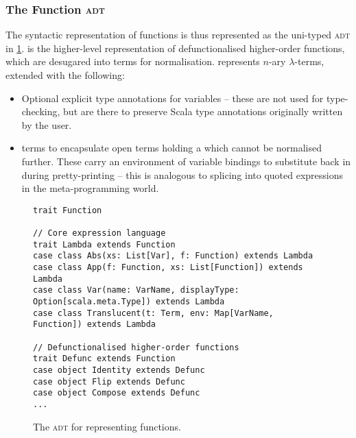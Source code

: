 \documentclass[../../main.tex]{subfiles}
\begin{document}
\subsubsection{The Function \textsc{adt}}
The syntactic representation of functions is thus represented as the uni-typed  \textsc{adt} in \cref{fig:function-adt}.
 is the higher-level representation of defunctionalised higher-order functions, which are desugared into  terms for normalisation.
 represents $n$-ary $\lambda$-terms, extended with the following:
\begin{itemize}
  \item Optional explicit type annotations for variables -- these are not used for type-checking, but are there to preserve Scala type annotations originally written by the user.
  \item {} terms to encapsulate open terms holding a  which cannot be normalised further. These carry an environment of variable bindings to substitute back in during pretty-printing -- this is analogous to splicing into quoted expressions in the meta-programming world.
\end{itemize}

\begin{figure}
\begin{verbatim}
trait Function

// Core expression language
trait Lambda extends Function
case class Abs(xs: List[Var], f: Function) extends Lambda
case class App(f: Function, xs: List[Function]) extends Lambda
case class Var(name: VarName, displayType: Option[scala.meta.Type]) extends Lambda
case class Translucent(t: Term, env: Map[VarName, Function]) extends Lambda

// Defunctionalised higher-order functions
trait Defunc extends Function
case object Identity extends Defunc
case object Flip extends Defunc
case object Compose extends Defunc
...
\end{verbatim}
\caption{The  \textsc{adt} for representing functions.}
\label{fig:function-adt}
\end{figure}
\end{document}
